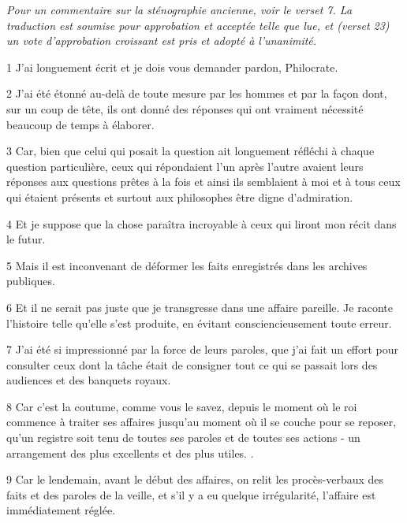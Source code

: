 \par \textit{Pour un commentaire sur la sténographie ancienne, voir le verset 7. La traduction est soumise pour approbation et acceptée telle que lue, et (verset 23) un vote d'approbation croissant est pris et adopté à l'unanimité.}

\par 1 J'ai longuement écrit et je dois vous demander pardon, Philocrate.

\par 2 J'ai été étonné au-delà de toute mesure par les hommes et par la façon dont, sur un coup de tête, ils ont donné des réponses qui ont vraiment nécessité beaucoup de temps à élaborer.

\par 3 Car, bien que celui qui posait la question ait longuement réfléchi à chaque question particulière, ceux qui répondaient l'un après l'autre avaient leurs réponses aux questions prêtes à la fois et ainsi ils semblaient à moi et à tous ceux qui étaient présents et surtout aux philosophes être digne d'admiration.

\par 4 Et je suppose que la chose paraîtra incroyable à ceux qui liront mon récit dans le futur.

\par 5 Mais il est inconvenant de déformer les faits enregistrés dans les archives publiques.

\par 6 Et il ne serait pas juste que je transgresse dans une affaire pareille. Je raconte l'histoire telle qu'elle s'est produite, en évitant consciencieusement toute erreur.

\par 7 J'ai été si impressionné par la force de leurs paroles, que j'ai fait un effort pour consulter ceux dont la tâche était de consigner tout ce qui se passait lors des audiences et des banquets royaux.

\par 8 Car c'est la coutume, comme vous le savez, depuis le moment où le roi commence à traiter ses affaires jusqu'au moment où il se couche pour se reposer, qu'un registre soit tenu de toutes ses paroles et de toutes ses actions - un arrangement des plus excellents et des plus utiles. .

\par 9 Car le lendemain, avant le début des affaires, on relit les procès-verbaux des faits et des paroles de la veille, et s'il y a eu quelque irrégularité, l'affaire est immédiatement réglée.

